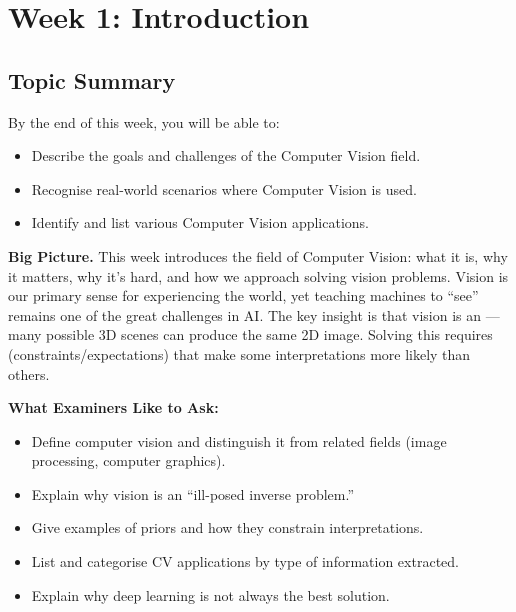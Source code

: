\section{Week 1: Introduction}

\subsection{Topic Summary}

\begin{keybox}
By the end of this week, you will be able to:
\begin{itemize}
  \item Describe the goals and challenges of the Computer Vision field.
  \item Recognise real-world scenarios where Computer Vision is used.
  \item Identify and list various Computer Vision applications.
\end{itemize}
\end{keybox}

\textbf{Big Picture.}
This week introduces the field of Computer Vision: what it is, why it matters, why it's hard, and how we approach solving vision problems. Vision is our primary sense for experiencing the world, yet teaching machines to ``see'' remains one of the great challenges in AI. The key insight is that vision is an ---many possible 3D scenes can produce the same 2D image. Solving this requires  (constraints/expectations) that make some interpretations more likely than others.

\separator

\textbf{What Examiners Like to Ask:}
\begin{itemize}
  \item Define computer vision and distinguish it from related fields (image processing, computer graphics).
  \item Explain why vision is an ``ill-posed inverse problem.''
  \item Give examples of priors and how they constrain interpretations.
  \item List and categorise CV applications by type of information extracted.
  \item Explain why deep learning is not always the best solution.
\end{itemize}

